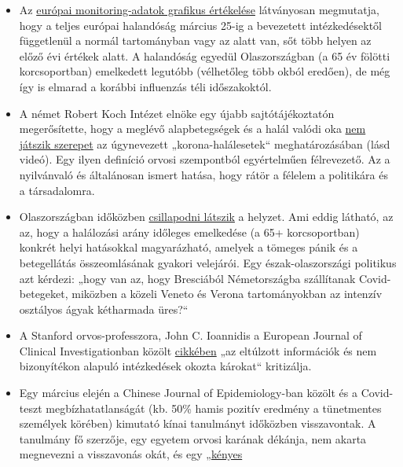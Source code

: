 \begin{itemize}
\tightlist
\item
  Az
  \href{https://off-guardian.org/2020/03/30/covid19-yet-to-impact-europes-overall-mortality/}{európai
  monitoring-adatok grafikus értékelése} látványosan megmutatja, hogy a
  teljes európai halandóság március 25-ig a bevezetett intézkedésektől
  függetlenül a normál tartományban vagy az alatt van, sőt több helyen
  az előző évi értékek alatt. A halandóság egyedül Olaszországban (a 65
  év fölötti korcsoportban) emelkedett legutóbb (vélhetőleg több okból
  eredően), de még így is elmarad a korábbi influenzás téli
  időszakoktól.
\item
  A német Robert Koch Intézet elnöke egy újabb sajtótájékoztatón
  megerősítette, hogy a meglévő alapbetegségek és a halál valódi oka
  \href{https://swprs.org/rki-relativiert-corona-todesfaelle/}{nem
  játszik szerepet} az úgynevezett „korona-halálesetek``
  meghatározásában (lásd videó). Egy ilyen definíció orvosi szempontból
  egyértelműen félrevezető. Az a nyilvánvaló és általánosan ismert
  hatása, hogy rátör a félelem a politikára és a társadalomra.
\item
  Olaszországban időközben
  \href{https://www.tagesspiegel.de/politik/die-verlangsamung-ist-da-in-italien-zeichnet-sich-die-wende-in-der-coronakrise-ab/25698124.html}{csillapodni
  látszik} a helyzet. Ami eddig látható, az az, hogy a halálozási arány
  időleges emelkedése (a 65+ korcsoportban) konkrét helyi hatásokkal
  magyarázható, amelyek a tömeges pánik és a betegellátás összeomlásának
  gyakori velejárói. Egy észak-olaszországi politikus azt kérdezi: „hogy
  van az, hogy Bresciából Németországba szállítanak Covid-betegeket,
  miközben a közeli Veneto és Verona tartományokban az intenzív
  osztályos ágyak kétharmada üres?``
\item
  A Stanford orvos-professzora, John C. Ioannidis a European Journal of
  Clinical Investigationban közölt
  \href{https://onlinelibrary.wiley.com/doi/abs/10.1111/eci.13222}{cikkében}
  „az eltúlzott információk és nem bizonyítékon alapuló intézkedések
  okozta károkat`` kritizálja.
\item
  Egy március elején a Chinese Journal of Epidemiology-ban közölt és a
  Covid-teszt megbízhatatlanságát (kb. 50\% hamis pozitív eredmény a
  tünetmentes személyek körében) kimutató kínai tanulmányt időközben
  visszavontak. A tanulmány fő szerzője, egy egyetem orvosi karának
  dékánja, nem akarta megnevezni a visszavonás okát, és egy
  „\href{https://www.npr.org/sections/health-shots/2020/03/26/822084429/in-defense-of-coronavirus-testing-strategy-administration-cited-retracted-study}{kényes
}
\end{itemize}
